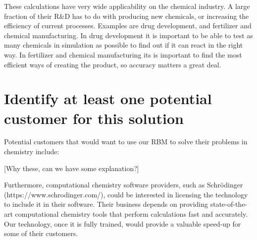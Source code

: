 \documentclass[a4paper]{article}
\begin{document}
These calculations have very wide applicability on the chemical industry. A large fraction of their R\&D has to do with producing new chemicals, or increasing the efficiency of current processes. Examples are drug development, and fertilizer and chemical manufacturing. In drug development it is important to be able to test as many chemicals in simulation as possible to find out if it can react in the right way. In fertilizer and chemical manufacturing its is important to find the most efficient ways of creating the product, so accuracy matters a great deal. 

\section{Identify at least one potential customer for this solution}

Potential customers that would want to use our RBM to solve their problems in chemistry include:
\newline


[Why these, can we have some explanation?]
\newline

Furthermore, computational chemistry software providers, such as Schrödinger \newline
(https://www.schrodinger.com/), could be interested in licensing the technology to include it in their software. Their business depends on providing state-of-the-art computational chemistry tools that perform calculations fast and accurately. Our technology, once it is fully trained, would provide a valuable speed-up for some of their customers. 
\end{document}

